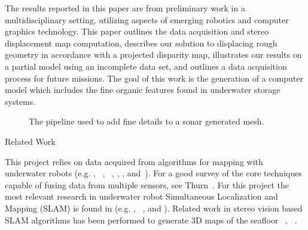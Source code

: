 \documentclass[twocolumn]{article}
\makeatletter
\def\section{\@startsection{section}{1}{\z@}{24pt plus 2 pt
minus 2 pt} {12pt plus 2pt minus 2pt}{\large\bf}}
\makeatother
\begin{document}
The results reported in this paper are from preliminary work in a multidisciplinary setting, utilizing aspects of emerging robotics and computer graphics technology. This paper outlines the data acquisition and stereo displacement map computation, describes our solution to displacing rough geometry in accordance with a projected disparity map, illustrates our results on a partial model using an incomplete data set, and outlines a data acquisition process for future missions. The goal of this work is the generation of a computer model which includes the fine organic features found in underwater storage systems.

\begin{figure*}[!ht]
  \vspace{-0.2cm}
  \caption{The pipeline used to add fine details to a sonar generated mesh.}
 \label{fig:systemblock}
\end{figure*}

\section{Related Work}
\label{sec:data}

This project relies on data acquired from algorithms for mapping with underwater robots (e.g. \cite{Williams2000}, ~\cite{Williams09}, ~\cite{opizarro-2009a}, \cite{Fairfield2005,Fairfield2006}, \cite{Clark2008b}, and~\cite{White10}). For a good survey of the core techniques capable of fusing data from multiple sensors, see Thurn~\cite{Thrun2005}.
For this project the most relevant  research in underwater robot Simultaneous Localization and Mapping (SLAM) is found in (e.g. \cite{Williams2000}, ~\cite{harbor}, and \cite{Fairfield2005,Fairfield2006}).  
Related work in stereo vision based SLAM algorithms has been performed to generate 3D maps of the seafloor ~\cite{Mahon:2011}, ~\cite{stereo:Roberson}.
\end{document}
